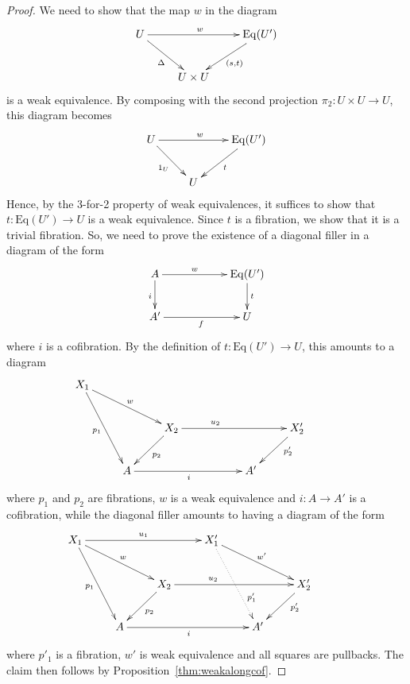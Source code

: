 \documentclass[reqno,10pt,a4paper,oneside]{amsart}
\theoremstyle{definition}
\newcommand{\co}{\colon}
\newcommand{\Ub}{U'}
\newcommand{\Weq}{\mathrm{Eq}}
\begin{document}
\begin{proof} We need to show that the map $w$ in the diagram
\[
\xymatrix{
U \ar[rr]^w \ar[dr]_{\Delta} & & \Weq(\Ub) \ar[dl]^{(s,t)} \\
 & U \times U }
 \]
 is a weak equivalence.  By composing with the second projection $\pi_2 \co U \times U \to U$, this diagram
 becomes 
 \[
\xymatrix{
U \ar[rr]^w \ar[dr]_{1_U} & & \Weq(\Ub) \ar[dl]^{t} \\
 & U  }
 \]
 Hence, by the 3-for-2 property of weak equivalences, it suffices to show that $t \co \Weq(\Ub) \to U$ is
 a weak equivalence. Since $t$ is a fibration, we show that it is a trivial fibration. So, we need to prove
 the existence of a diagonal filler in a diagram of the form
 \begin{equation*}
 \xymatrix@C=2cm{
 A \ar[d]_i \ar[r]^-{w}  & \Weq(\Ub) \ar[d]^t \\
 A' \ar[r]_{f} & U }
 \end{equation*}
where $i$ is a cofibration. By the definition of $t \co \Weq(\Ub) \to U$, this amounts to a diagram
 \[
 \xymatrix{
 X_1 \ar[ddr]_{p_1}  \ar[drr]^{w}  &  & &  & & \\
  & & X_2 \ar[dl]^{p_2} \ar[rrr]^(.35){u_2} & & &  X_2' \ar[dl]^(.35){p'_2} \\
  & A \ar[rrr]_{i}  & & &A' & & }
  \]
  where $p_1$ and $p_2$ are fibrations, $w$ is a weak equivalence and $i \co A \to A'$ is a cofibration,  
  while the diagonal filler amounts to having a diagram of the form
 \[
 \xymatrix{
 X_1 \ar[ddr]_{p_1}  \ar[drr]^{w} \ar[rrr]^{u_1} &  & & X_1' \ar[drr]^{w'}  \ar@{.>}[ddr]^(.7){p_1'}  & & \\
  & & X_2 \ar[dl]^{p_2} \ar[rrr]^(.35){u_2} & & &  X_2' \ar[dl]^(.35){p'_2} \\
  & A \ar[rrr]_{i}  & & &A' & & }
  \]
where $p'_1$ is a fibration, $w'$ is weak equivalence and all squares are pullbacks. The claim then
follows by Proposition~\ref{thm:weakalongcof}.
 \end{proof} 
\end{document}
